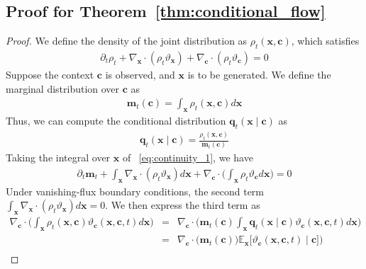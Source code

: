 \documentclass{article} %
\begin{document}
\subsection{Proof for Theorem~\ref{thm:conditional_flow}}
\label{sec:proof_ode_conditional}
\begin{proof}
 We define the density of the joint distribution as $\rho_{t}(\mathbf{x}, \mathbf{c})$, which satisfies
\begin{eqnarray}
    \partial_{t} \rho_t + \nabla_{\mathbf{x}} \cdot (\rho_t \vartheta_{\mathbf{x}}) + \nabla_{\mathbf{c}} \cdot (\rho_t \vartheta_{\mathbf{c}}) = 0 \label{eq:continuity_1}
\end{eqnarray}
Suppose the context $\mathbf{c}$ is observed, and $\mathbf{x}$ is to be generated. We define the marginal distribution over $\mathbf{c}$ as
\begin{eqnarray}
    \mathbf{m}_t (\mathbf{c}) = \int_{\mathbf{x}} \rho_t(\mathbf{x},  \mathbf{c}) d \mathbf{x}
\end{eqnarray}
Thus, we can compute the conditional distribution $\mathbf{q}_t (\mathbf{x} \mid \mathbf{c})$ as 
\begin{eqnarray}
    \mathbf{q}_t (\mathbf{x} \mid \mathbf{c}) = \frac{\rho_t(\mathbf{x}, \mathbf{c})}{\mathbf{m}_t (\mathbf{c})}
\end{eqnarray}
Taking the integral over $\mathbf{x}$ of ~\eqref{eq:continuity_1}, we have 
\begin{eqnarray}
    \partial_t \mathbf{m}_t + \int_{\mathbf{x}} \nabla_{\mathbf{x}} \cdot (\rho_t \vartheta_{\mathbf{x}}) d\mathbf{x} +  \nabla_{\mathbf{c}} \cdot \Big(\int_{\mathbf{x}}\rho_t \vartheta_{\mathbf{c}}  d\mathbf{x} \Big) =0 \label{eq:intergal_x}
\end{eqnarray}
Under vanishing-flux boundary conditions, the second term $\int_{\mathbf{x}} \nabla_{\mathbf{x}} \cdot (\rho_t \vartheta_{\mathbf{x}}) d\mathbf{x} = 0$. We then express the third term as 
\begin{eqnarray}
    \nabla_{\mathbf{c}} \cdot \Big(\int_{\mathbf{x}}\rho_t(\mathbf{x}, \mathbf{c}) \vartheta_{\mathbf{c}} (\mathbf{x}, \mathbf{c}, t)  d\mathbf{x} \Big) &= &\nabla_{\mathbf{c}} \cdot \Big(\mathbf{m}_t (\mathbf{c})\int_{\mathbf{x}}  \mathbf{q}_t (\mathbf{x} \mid \mathbf{c}) \vartheta_{\mathbf{c}} (\mathbf{x}, \mathbf{c}, t) d\mathbf{x} \Big) \\ \nonumber
    &= &\nabla_{\mathbf{c}} \cdot \Big(\mathbf{m}_t (\mathbf{c})) \mathbb{E}_{\mathbf{x}}  \big[ \vartheta_{\mathbf{c}} (\mathbf{x}, \mathbf{c},t )\mid \mathbf{c}\big]  \Big) \\ \nonumber

\end{eqnarray}
\end{proof}
\end{document}

